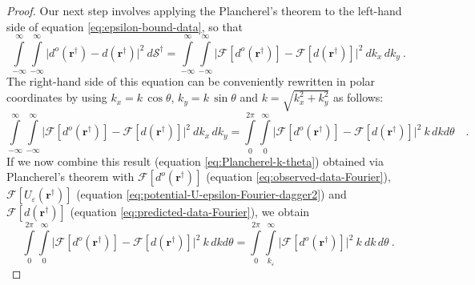 \begin{proof}
	Our next step involves applying the Plancherel's theorem \citep[][ p. 119]{bracewell1999} to the 
	left-hand side of equation \ref{eq:epsilon-bound-data}, so that
	\begin{equation}
		\int\limits_{-\infty}^{\infty} \int\limits_{-\infty}^{\infty}
		\vert 
		d^{o}(\mathbf{r}^{\dagger}) - d(\mathbf{r}^{\dagger})
		\vert^{2} 
		\: d\mathcal{S}^{\dagger} = 
		\int\limits_{-\infty}^{\infty} \int\limits_{-\infty}^{\infty}
		\vert \mathcal{F} [ d^{o}(\mathbf{r}^{\dagger}) ] - \mathcal{F} [
		d(\mathbf{r}^{\dagger}) ] \vert^{2} 
		\: d k_{x} \, d k_{y} \: .
		\label{eq:Plancherel-kx-ky}
	\end{equation}
	The right-hand side of this equation can be conveniently rewritten in 
	polar coordinates by using $k_{x} = k \, \cos\theta$, 
	$k_{y} = k \, \sin\theta$ and $k = \sqrt{k_{x}^{2} + k_{y}^{2}}$ as follows:
	\begin{equation}
		\int\limits_{-\infty}^{\infty} \int\limits_{-\infty}^{\infty}
		\vert \mathcal{F} [ d^{o}(\mathbf{r}^{\dagger}) ] - \mathcal{F} [
		d(\mathbf{r}^{\dagger}) ] \vert^{2} 
		\: d k_{x} \, d k_{y} = 
		\int\limits_{0}^{2\pi} \int\limits_{0}^{\infty}
		\vert \mathcal{F} [ d^{o}(\mathbf{r}^{\dagger}) ] - \mathcal{F} [
		d(\mathbf{r}^{\dagger}) ] \vert^{2} \: k \, dkd\theta 	
		\quad .
		\label{eq:Plancherel-k-theta}
	\end{equation}
	If we now combine this result (equation \ref{eq:Plancherel-k-theta}) 
	obtained via Plancherel's theorem with
	$\mathcal{F} [ d^{o}(\mathbf{r}^{\dagger}) ]$ (equation \ref{eq:observed-data-Fourier}),
	$\mathcal{F} [ U_{\varepsilon}(\mathbf{r}^{\dagger}) ]$ (equation \ref{eq:potential-U-epsilon-Fourier-dagger2})	
	and $\mathcal{F} [ d(\mathbf{r}^{\dagger}) ]$ (equation \ref{eq:predicted-data-Fourier}),
	we obtain
	\begin{equation}
		\int\limits_{0}^{2\pi} \int\limits_{0}^{\infty}
		\vert \mathcal{F} [ d^{o}(\mathbf{r}^{\dagger}) ] - \mathcal{F} [
		d(\mathbf{r}^{\dagger}) ] \vert^{2} \: k \, dkd\theta =
		\int\limits_{0}^{2\pi} \int\limits_{k_{\varepsilon}}^{\infty}
		\vert \mathcal{F} [ d^{o}(\mathbf{r}^{\dagger}) ] \vert^{2} 
		\: k \: d k \, d \theta \: .
		\label{eq:Plancherel-data}
	\end{equation}


\end{proof}
